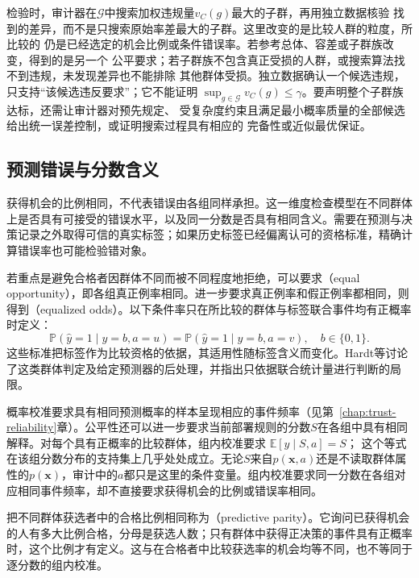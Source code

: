 检验时，审计器在$\mathcal G$中搜索加权违规量$v_C(g)$最大的子群，再用独立数据核验
找到的差异，而不是只搜索原始率差最大的子群。这里改变的是比较人群的粒度，所比较的
仍是已经选定的机会比例或条件错误率。若参考总体、容差或子群族改变，得到的是另一个
公平要求；若子群族不包含真正受损的人群，或搜索算法找不到违规，未发现差异也不能排除
其他群体受损。独立数据确认一个候选违规，只支持“该候选违反要求”；它不能证明
$\sup_{g\in\mathcal G}v_C(g)\leq\gamma$。要声明整个子群族达标，还需让审计器对预先规定、
受复杂度约束且满足最小概率质量的全部候选给出统一误差控制，或证明搜索过程具有相应的
完备性或近似最优保证。

\subsection{预测错误与分数含义}
\label{sec:fairness-prediction-comparison}

获得机会的比例相同，不代表错误由各组同样承担。这一维度检查模型在不同群体上是否具有可接受的错误水平，以及同一分数是否具有相同含义。需要在预测与决策记录之外取得可信的真实标签；如果历史标签已经偏离认可的资格标准，精确计算错误率也可能检验错对象。

若重点是避免合格者因群体不同而被不同程度地拒绝，可以要求（equal opportunity），即各组真正例率相同。进一步要求真正例率和假正例率都相同，则得到（equalized odds）。以下条件率只在所比较的群体与标签联合事件均有正概率时定义：
\begin{equation}
 \mathbb P(\hat y=1\mid y=b,a=u)
 =\mathbb P(\hat y=1\mid y=b,a=v),
 \quad b\in\{0,1\}.
 \label{eq:fairness-equalized-odds}
\end{equation}
这些标准把标签作为比较资格的依据，其适用性随标签含义而变化。Hardt等讨论了这类群体判定及给定预测器的后处理，并指出只依据联合统计量进行判断的局限。

概率校准要求具有相同预测概率的样本呈现相应的事件频率（见第~\ref{chap:trust-reliability}章）。公平性还可以进一步要求当前部署规则的分数$S$在各组中具有相同解释。对每个具有正概率的比较群体，组内校准要求
$\mathbb E[y\mid S,a]=S$；
这个等式在该组分数分布的支持集上几乎处处成立。无论$S$来自$p(\bm{x},a)$还是不读取群体属性的$p(\bm{x})$，审计中的$a$都只是这里的条件变量。组内校准要求同一分数在各组对应相同事件频率，却不直接要求获得机会的比例或错误率相同。

把不同群体获选者中的合格比例相同称为（predictive parity）。它询问已获得机会的人有多大比例合格，分母是获选人数；只有群体中获得正决策的事件具有正概率时，这个比例才有定义。这与在合格者中比较获选率的机会均等不同，也不等同于逐分数的组内校准。

